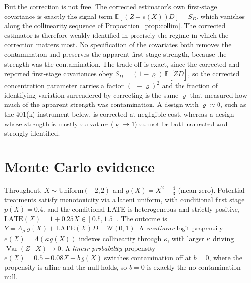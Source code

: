 \documentclass[11pt]{article}
\theoremstyle{plain}
\theoremstyle{definition}
\newcommand{\E}{\mathbb{E}}
\newcommand{\Var}{\operatorname{Var}}
\newcommand{\Zt}{\tilde{Z}}
\begin{document}
But the correction is not free. The corrected estimator's own first-stage covariance is exactly the signal term $\E[(Z-e(X))D]=S_D$, which vanishes along the collinearity sequence of Proposition~\ref{prop:collim}. The corrected estimator is therefore weakly identified in precisely the regime in which the correction matters most. No specification of the covariates both removes the contamination and preserves the apparent first-stage strength, because the strength was the contamination. The trade-off is exact, since the corrected and reported first-stage covariances obey $S_D=(1-\varrho)\,\E[\Zt D]$, so the corrected concentration parameter carries a factor $(1-\varrho)^2$ and the fraction of identifying variation surrendered by correcting is the same $\varrho$ that measured how much of the apparent strength was contamination. A design with $\varrho\approx 0$, such as the 401(k) instrument below, is corrected at negligible cost, whereas a design whose strength is mostly curvature ($\varrho\to 1$) cannot be both corrected and strongly identified.

\section{Monte Carlo evidence}\label{sec:mc}

Throughout, $X\sim\text{Uniform}(-2,2)$ and $g(X)=X^2-\tfrac43$ (mean zero). Potential treatments satisfy monotonicity via a latent uniform, with conditional first stage $p(X)=0.4$, and the conditional LATE is heterogeneous and strictly positive, $\mathrm{LATE}(X)=1+0.25X\in[0.5,1.5]$. The outcome is $Y=A_\mu\,g(X)+\mathrm{LATE}(X)D+\mathcal{N}(0,1)$. A \emph{nonlinear} logit propensity $e(X)=\Lambda(\kappa\,g(X))$ indexes collinearity through $\kappa$, with larger $\kappa$ driving $\Var(Z\mid X)\to 0$. A \emph{linear-probability} propensity $e(X)=0.5+0.08X+b\,g(X)$ switches contamination off at $b=0$, where the propensity is affine and the null holds, so $b=0$ is exactly the no-contamination null.
\end{document}
